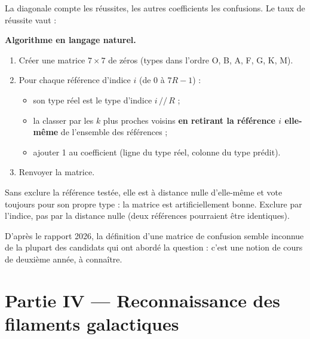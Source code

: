 \documentclass[11pt,a4paper]{article}
\providecommand{\tightlist}{\setlength{\itemsep}{0pt}\setlength{\parskip}{0pt}}
\newcommand{\equationajustee}[1]{%
  \sbox{\boiteequation}{$\displaystyle #1$}%
  \ifdim\wd\boiteequation>\linewidth
    \[\resizebox{\linewidth}{!}{\usebox{\boiteequation}}\]%
  \else
    \[#1\]%
  \fi}
\begin{document}
La diagonale compte les réussites, les autres coefficients les confusions. Le taux de réussite vaut :

\equationajustee{\tau = \frac{\sum_i M_{ii}}{\sum_{i,j} M_{ij}}}

\textbf{Algorithme en langage naturel.}

\begin{enumerate}
\def\labelenumi{\arabic{enumi}.}
\tightlist
\item
  Créer une matrice \(7 \times 7\) de zéros (types dans l'ordre O, B, A, F, G, K, M).
\item
  Pour chaque référence d'indice \(i\) (de 0 à \(7R - 1\)) :

  \begin{itemize}
  \tightlist
  \item
    son type réel est le type d'indice \(i \,//\, R\) ;
  \item
    la classer par les \(k\) plus proches voisins \textbf{en retirant la référence \(i\) elle-même} de l'ensemble des références ;
  \item
    ajouter 1 au coefficient (ligne du type réel, colonne du type prédit).
  \end{itemize}
\item
  Renvoyer la matrice.
\end{enumerate}

\begin{piege}

Sans exclure la référence testée, elle est à distance nulle d'elle-même et vote toujours pour son propre type : la matrice est artificiellement bonne. Exclure par l'indice, pas par la distance nulle (deux références pourraient être identiques).

\end{piege}

\begin{jury}

D'après le rapport 2026, la définition d'une matrice de confusion semble inconnue de la plupart des candidats qui ont abordé la question : c'est une notion de cours de deuxième année, à connaître.

\end{jury}

\hypertarget{partie-iv-reconnaissance-des-filaments-galactiques}{%
\section{Partie IV --- Reconnaissance des filaments galactiques}\label{partie-iv-reconnaissance-des-filaments-galactiques}}
\end{document}
